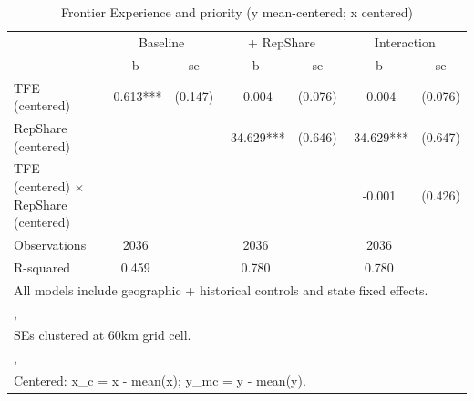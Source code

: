\begin{table}[htbp]\centering
\def\sym#1{\ifmmode^{#1}\else\(^{#1}\)\fi}
\caption{Frontier Experience and priority (y mean-centered; x centered)}
\begin{tabular}{l*{3}{cc}}
\toprule
                &\multicolumn{2}{c}{Baseline}&\multicolumn{2}{c}{ + RepShare}&\multicolumn{2}{c}{Interaction}\\
                &        b   &       se&        b   &       se&        b   &       se\\
\midrule
TFE (centered)  &   -0.613***&  (0.147)&   -0.004   &  (0.076)&   -0.004   &  (0.076)\\
RepShare (centered)&            &         &  -34.629***&  (0.646)&  -34.629***&  (0.647)\\
TFE (centered) $\times$ RepShare (centered)&            &         &            &         &   -0.001   &  (0.426)\\
\midrule
Observations    &     2036   &         &     2036   &         &     2036   &         \\
R-squared       &    0.459   &         &    0.780   &         &    0.780   &         \\
\bottomrule
\multicolumn{7}{l}{\footnotesize All models include geographic + historical controls and state fixed effects.}\\
\multicolumn{7}{l}{\footnotesize ,}\\
\multicolumn{7}{l}{\footnotesize SEs clustered at 60km grid cell.}\\
\multicolumn{7}{l}{\footnotesize ,}\\
\multicolumn{7}{l}{\footnotesize Centered: x\_c = x - mean(x); y\_mc = y - mean(y).}\\
\end{tabular}
\end{table}

